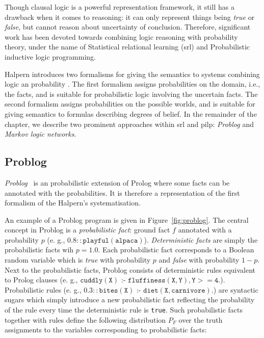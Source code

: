 Though clausal logic is a powerful representation framework, it still has a drawback when it comes to reasoning: it can only represent things being \textit{true} or \textit{false}, but cannot reason about uncertainty of conclusion.
Therefore, significant work has been devoted towards combining logic reasoning with probability theory, under the name of Statistical relational learning (\gls{srl}) and Probabilistic inductive logic programming.




Halpern introduces two formalisms for giving the semantics to systems combining logic an probability \cite{Halpern90ananalysis}.
The first formalism assigns probabilities on the domain, i.e., the facts, and is suitable for probabilistic logic involving the uncertain facts.
The second formalism assigns probabilities on the possible worlds, and is suitable for giving semantics to formulas describing degrees of belief.
In the remainder of the chapter, we describe two prominent approaches within \gls{srl} and \gls{pilp}: \textit{Problog} and \textit{Markov logic networks}.


\subsection{Problog}

\textit{Problog}~\cite{DeRaedt:2007:PPP:1625275.1625673} is an probabilistic extension of Prolog where some facts can be annotated with the probabilities.
It is therefore a representation of the first formalism of the Halpern's systematisation.

An example of a Problog program is given in Figure~\ref{fig:problog}.
The central concept in Problog is a \textit{probabilistic fact}: ground fact $f$ annotated with a probability $p$ (e. g., $0.8{:: }{\mathtt {playful(alpaca)}}$).
\textit{Deterministic facts} are simply the probabilistic facts wih $p = 1.0$.
Each probabilistic fact corresponds to a Boolean random variable which is \textit{true} with probability $p$ and \textit{false} with probability $1-p$.
Next to the probabilistic facts, Problog consists of deterministic rules equivalent to Prolog clauses (e. g., ${\mathtt {cuddly(X)} \text{ :- }{\mathtt {fluffiness(X,Y),Y >= 4}}.}$).
Probabilistic rules (e. g., $0.3{:: }{\mathtt {bites(X)}} \text{ :- }{\mathtt {diet(X,carnivore)}}.$) are syntactic sugars which simply introduce a new probabilistic fact reflecting the probability of the rule every time the deterministic rule is \texttt{true}.
Such probabilistic facts together with rules define the following distribution $P_{F}$ over the truth assignments to the variables corresponding to probabilistic facts:

